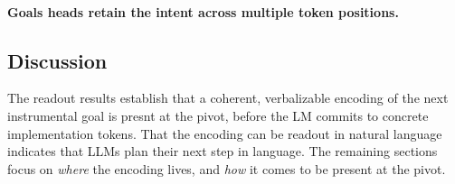\paragraph{Goals heads retain the intent across multiple token positions.}

\subsection{Discussion}
\label{sec:what:discussion}

The readout results establish that a coherent, verbalizable encoding of the next instrumental goal is presnt at the pivot, before the LM commits to concrete implementation tokens. That the encoding can be readout in natural language indicates that LLMs plan their next step in language. The remaining sections focus on \emph{where} the encoding lives, and \emph{how} it comes to be present at the pivot. 